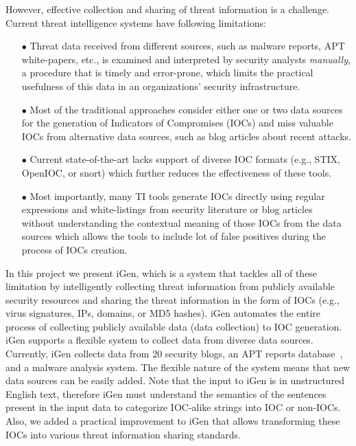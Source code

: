 However, effective collection and sharing of threat information is a challenge. Current threat intelligence systems have following limitations: 
\begin{itemize}
 \item[$\bullet$ ] Threat data received from different sources, such as malware reports, APT white-papers, etc., is examined and interpreted
by security analysts \emph{manually}, a procedure that is timely and error-prone, which limits the practical usefulness of this
data in an organizations' security infrastructure. 
  \item[$\bullet$ ] Most of the traditional approaches consider either one or two data sources for the generation of Indicators of Compromises
(IOCs) and miss valuable IOCs from alternative data sources, such as blog articles about recent attacks.
  \item[$\bullet$ ] Current state-of-the-art lacks support of diverse IOC formats (e.g., STIX, OpenIOC, or snort) which further reduces the effectiveness of these tools. 
\item[$\bullet$ ] Most importantly, many TI tools generate IOCs directly using regular expressions and white-listings from security literature or blog articles~\cite{otx} without understanding the contextual meaning of those IOCs from the data sources which allows the tools to include lot of false positives during the process of IOCs creation.
\end{itemize}


In this project we present iGen, which is a system that tackles all of these limitation by intelligently collecting threat information from publicly available security resources and sharing the threat information in the form of IOCs (e.g., virus signatures, IPs, domains, or MD5 hashes). iGen automates the entire process of collecting publicly available data (data collection) to IOC generation. iGen supports a flexible system to collect data from diverse data sources. Currently, iGen collects data from 20 security blogs, an APT reports database~\cite{apt}, and a malware analysis system. The flexible nature of the system means that new data sources can be easily added. Note that the input to iGen is in unstructured English text, therefore iGen must understand the semantics of the sentences present in the input data to categorize IOC-alike strings into IOC or non-IOCs. Also, we added a practical improvement to iGen that allows transforming these IOCs into various threat information sharing standards.

